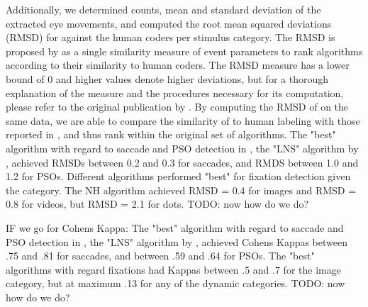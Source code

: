 

Additionally, we determined counts, mean and standard deviation of the extracted eye movements, and computed the root mean squared deviations (RMSD) for \remodnav against the human coders per stimulus category. The RMSD is proposed by \cite{Andersson2017} as a single similarity measure of event parameters to rank algorithms according to their similarity to human coders. The RMSD measure has a lower bound of 0 and higher values denote higher deviations, but for a thorough explanation of the measure and the procedures necessary for its computation, please refer to the original publication by \cite{Andersson2017}. By computing the RMSD of \remodnav on the same data, we are able to compare the similarity of \remodnav to human labeling with those reported in \cite{Andersson2017}, and thus rank \remodnav within the original set of algorithms. 
The "best" algorithm with regard to saccade and PSO detection in \cite{Andersson2017}, the "LNS" algorithm by \cite{Larsson2013}, achieved RMSDs between 0.2 and 0.3 for saccades, and RMDS between 1.0 and 1.2 for PSOs. Different algorithms performed "best" for fixation detection given the category. The NH algorithm achieved RMSD = 0.4 for images and RMSD = 0.8 for videos, but RMSD = 2.1 for dots. TODO: now how do we do?

IF we go for Cohens Kappa: The "best" algorithm with regard to saccade and PSO detection in \cite{Andersson2017}, the "LNS" algorithm by \cite{Larsson2013}, achieved Cohens Kappas between .75 and .81 for saccades, and between .59 and .64 for PSOs. The "best" algorithms with regard fixations had Kappas between .5 and .7 for the image category, but at maximum .13 for any of the dynamic categories. TODO: now how do we do? \\

